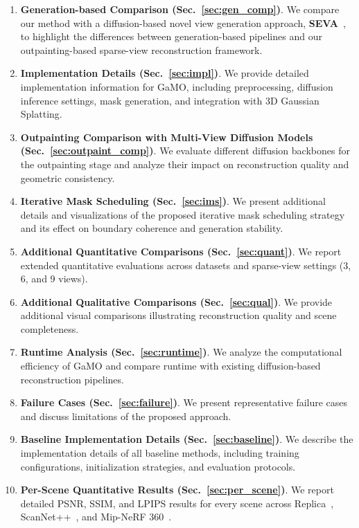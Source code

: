\documentclass[runningheads]{llncs}
\begin{document}
\begin{enumerate}

\item \textbf{Generation-based Comparison (Sec.~\ref{sec:gen_comp})}. 
We compare our method with a diffusion-based novel view generation approach, \textbf{SEVA}~\cite{zhou2025stable}, to highlight the differences between generation-based pipelines and our outpainting-based sparse-view reconstruction framework.

\item \textbf{Implementation Details (Sec.~\ref{sec:impl})}. 
We provide detailed implementation information for GaMO, including preprocessing, diffusion inference settings, mask generation, and integration with 3D Gaussian Splatting.

\item \textbf{Outpainting Comparison with Multi-View Diffusion Models (Sec.~\ref{sec:outpaint_comp})}. 
We evaluate different diffusion backbones for the outpainting stage and analyze their impact on reconstruction quality and geometric consistency.

\item \textbf{Iterative Mask Scheduling (Sec.~\ref{sec:ims})}. 
We present additional details and visualizations of the proposed iterative mask scheduling strategy and its effect on boundary coherence and generation stability.

\item \textbf{Additional Quantitative Comparisons (Sec.~\ref{sec:quant})}. 
We report extended quantitative evaluations across datasets and sparse-view settings (3, 6, and 9 views).

\item \textbf{Additional Qualitative Comparisons (Sec.~\ref{sec:qual})}. 
We provide additional visual comparisons illustrating reconstruction quality and scene completeness.

\item \textbf{Runtime Analysis (Sec.~\ref{sec:runtime})}. 
We analyze the computational efficiency of GaMO and compare runtime with existing diffusion-based reconstruction pipelines.

\item \textbf{Failure Cases (Sec.~\ref{sec:failure})}. 
We present representative failure cases and discuss limitations of the proposed approach.

\item \textbf{Baseline Implementation Details (Sec.~\ref{sec:baseline})}. 
We describe the implementation details of all baseline methods, including training configurations, initialization strategies, and evaluation protocols.

\item \textbf{Per-Scene Quantitative Results (Sec.~\ref{sec:per_scene})}. 
We report detailed PSNR, SSIM, and LPIPS results for every scene across Replica~\cite{straub2019replica}, ScanNet++~\cite{yeshwanth2023scannet++}, and Mip-NeRF 360~\cite{barron2023mipnerf360}.

\end{enumerate}
\end{document}
